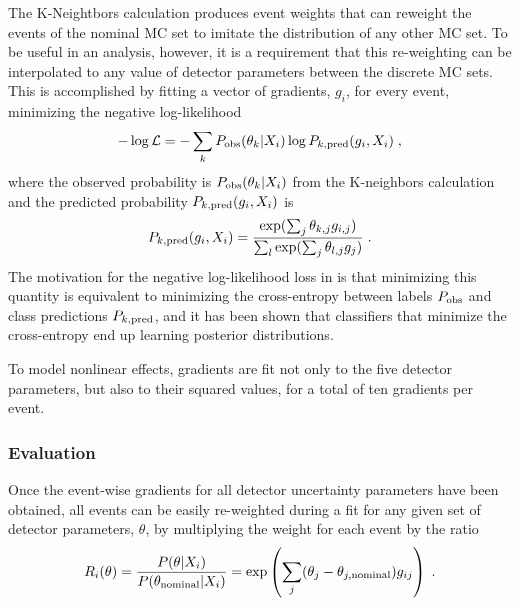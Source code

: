 The K-Neightbors calculation produces event weights that can reweight the events of the nominal MC set to imitate the distribution of any other MC set. To be useful in an analysis, however, it is a requirement that this re-weighting can be interpolated to any value of detector parameters between the discrete MC sets. This is accomplished by fitting a vector of gradients, $g_i$, for every event, minimizing the negative log-likelihood
\begin{equation}
    -\log\mathcal{L} = -\sum_k P_{\rm obs}(\theta_k | X_i) \log P_{k, \rm pred}(g_i, X_i)\;, \label{eq:grad-nllh}
\end{equation}
where the observed probability is $P_{\rm obs}(\theta_k | X_i)$ from the K-neighbors calculation and the  predicted probability $P_{k, \rm pred}(g_i, X_i)$ is
\begin{equation}
    P_{k, \rm pred}(g_i, X_i) = \frac{\exp(\sum_j \theta_{k,j} g_{i,j})}{\sum_l\exp(\sum_j \theta_{l,j} g_j)}\;.
\end{equation}
The motivation for the negative log-likelihood loss in  is that minimizing this quantity is equivalent to minimizing the cross-entropy between labels $P_{\rm obs}$ and class predictions $P_{k, \rm pred}$, and it has been shown that classifiers that minimize the cross-entropy end up learning posterior distributions\cite{NNPosteriors}.

To model nonlinear effects, gradients are fit not only to the five detector parameters, but also to their squared values, for a total of ten gradients per event.

\subsubsection{Evaluation}
Once the event-wise gradients for all detector uncertainty parameters have been obtained, all events can be easily re-weighted during a fit for any given set of detector parameters, $\theta$, by multiplying the weight for each event by the ratio
\begin{equation}
    R_i(\theta)=\frac{P(\theta|X_i)}{P(\theta_{\rm nominal}|X_i)}=\exp\left(\sum_j (\theta_j - \theta_{j, \rm nominal}) g_{ij}\right)\;.\label{eq:ultrasurf-eval}
\end{equation}

